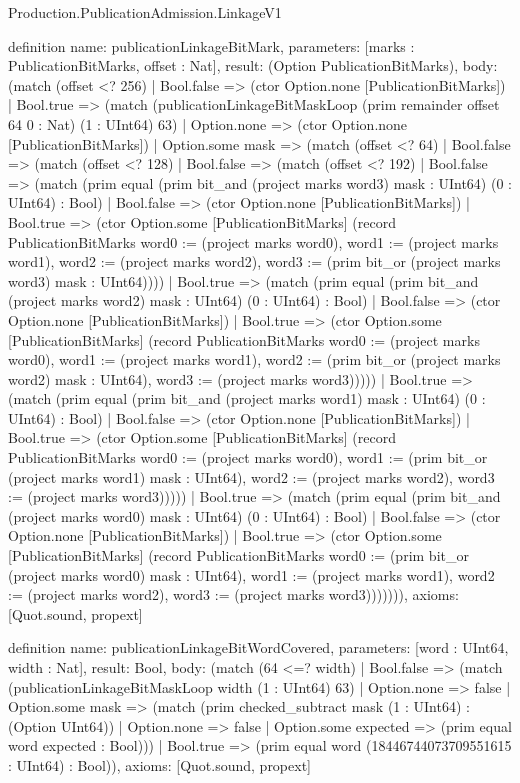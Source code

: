 \begin{lexlean}{Production.PublicationAdmission.LinkageV1}
\begin{semanticmodule}
definition{
  name: publicationLinkageBitMark,
  parameters: [marks : PublicationBitMarks, offset : Nat],
  result: (Option PublicationBitMarks),
  body: (match (offset <? 256)
    | Bool.false => (ctor Option.none [PublicationBitMarks])
    | Bool.true => (match (publicationLinkageBitMaskLoop (prim remainder offset 64 0 : Nat) (1 : UInt64) 63)
      | Option.none => (ctor Option.none [PublicationBitMarks])
      | Option.some mask => (match (offset <? 64)
        | Bool.false => (match (offset <? 128)
          | Bool.false => (match (offset <? 192)
            | Bool.false => (match (prim equal (prim bit_and (project marks word3) mask : UInt64) (0 : UInt64) : Bool)
              | Bool.false => (ctor Option.none [PublicationBitMarks])
              | Bool.true => (ctor Option.some [PublicationBitMarks] (record PublicationBitMarks {word0 := (project marks word0), word1 := (project marks word1), word2 := (project marks word2), word3 := (prim bit_or (project marks word3) mask : UInt64)})))
            | Bool.true => (match (prim equal (prim bit_and (project marks word2) mask : UInt64) (0 : UInt64) : Bool)
              | Bool.false => (ctor Option.none [PublicationBitMarks])
              | Bool.true => (ctor Option.some [PublicationBitMarks] (record PublicationBitMarks {word0 := (project marks word0), word1 := (project marks word1), word2 := (prim bit_or (project marks word2) mask : UInt64), word3 := (project marks word3)}))))
          | Bool.true => (match (prim equal (prim bit_and (project marks word1) mask : UInt64) (0 : UInt64) : Bool)
            | Bool.false => (ctor Option.none [PublicationBitMarks])
            | Bool.true => (ctor Option.some [PublicationBitMarks] (record PublicationBitMarks {word0 := (project marks word0), word1 := (prim bit_or (project marks word1) mask : UInt64), word2 := (project marks word2), word3 := (project marks word3)}))))
        | Bool.true => (match (prim equal (prim bit_and (project marks word0) mask : UInt64) (0 : UInt64) : Bool)
          | Bool.false => (ctor Option.none [PublicationBitMarks])
          | Bool.true => (ctor Option.some [PublicationBitMarks] (record PublicationBitMarks {word0 := (prim bit_or (project marks word0) mask : UInt64), word1 := (project marks word1), word2 := (project marks word2), word3 := (project marks word3)})))))),
  axioms: [Quot.sound, propext]
}

definition{
  name: publicationLinkageBitWordCovered,
  parameters: [word : UInt64, width : Nat],
  result: Bool,
  body: (match (64 <=? width)
    | Bool.false => (match (publicationLinkageBitMaskLoop width (1 : UInt64) 63)
      | Option.none => false
      | Option.some mask => (match (prim checked_subtract mask (1 : UInt64) : (Option UInt64))
        | Option.none => false
        | Option.some expected => (prim equal word expected : Bool)))
    | Bool.true => (prim equal word (18446744073709551615 : UInt64) : Bool)),
  axioms: [Quot.sound, propext]
}


\end{semanticmodule}
\end{lexlean}
